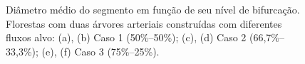 \begin{figure}[!htb]
  \centering
  \captiondelim{: }
  \caption{Diâmetro médio do segmento em função de seu nível de bifurcação. 
  Florestas com duas árvores arteriais construídas com diferentes fluxos alvo: 
  (a), (b) Caso 1 (50\%--50\%); (c), (d) Caso 2 (66,7\%--33,3\%);  (e), (f) Caso 3 (75\%--25\%).}
  
  \hspace{12pt}


\end{figure}
